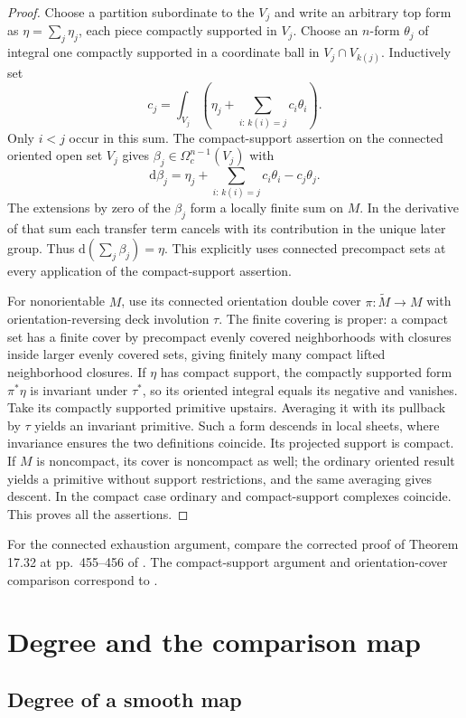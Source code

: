 \documentclass[11pt,oneside,openany]{book}
\theoremstyle{definition}
\theoremstyle{remark}
\newcommand{\dd}{\mathrm d}
\begin{document}
\begin{proof}
Choose a partition subordinate to the \(V_j\) and write an
arbitrary top form as \(\eta=\sum_j\eta_j\), each piece
compactly supported in \(V_j\). Choose an \(n\)-form
\(\theta_j\) of integral one compactly supported in a
coordinate ball in \(V_j\cap V_{k(j)}\). Inductively set
\[
     c_j=\int_{V_j}\left(\eta_j+
              \sum_{i:\,k(i)=j} c_i\theta_i\right).
\]
Only \(i<j\) occur in this sum. The compact-support
assertion on the connected oriented open set \(V_j\) gives
\(\beta_j\in\Omega_c^{n-1}(V_j)\) with
\[
   \dd\beta_j=\eta_j+\sum_{i:\,k(i)=j}c_i\theta_i-c_j\theta_j.
\]
The extensions by zero of the \(\beta_j\) form a locally
finite sum on \(M\). In the derivative of that sum each
transfer term cancels with its contribution in the unique
later group. Thus \(\dd(\sum_j\beta_j)=\eta\). This explicitly
uses connected precompact sets at every application of
the compact-support assertion.

For nonorientable \(M\), use its connected orientation double
cover \(\pi:\widetilde M\to M\) with orientation-reversing
deck involution \(\tau\). The finite covering is proper:
a compact set has a finite cover by precompact evenly
covered neighborhoods with closures inside larger evenly
covered sets, giving finitely many compact lifted
neighborhood closures. If \(\eta\) has compact support,
the compactly supported form \(\pi^*\eta\) is invariant
under \(\tau^*\), so its oriented integral equals its
negative and vanishes. Take its compactly supported
primitive upstairs. Averaging it with its pullback by
\(\tau\) yields an invariant primitive. Such a form
descends in local sheets, where invariance ensures the
two definitions coincide. Its projected support is
compact. If \(M\) is noncompact, its cover is noncompact
as well; the ordinary oriented result yields a primitive
without support restrictions, and the same averaging
gives descent. In the compact case ordinary and
compact-support complexes coincide. This proves all
the assertions.
\end{proof}
For the connected exhaustion argument, compare the corrected
proof of Theorem 17.32 at pp.~455--456 of \cite{leeerrata}.
The compact-support argument and orientation-cover comparison
correspond to \cite[Theorems 17.30--17.34]{lee}.
\chapter{Degree and the comparison map}

\section{Degree of a smooth map}
\end{document}
